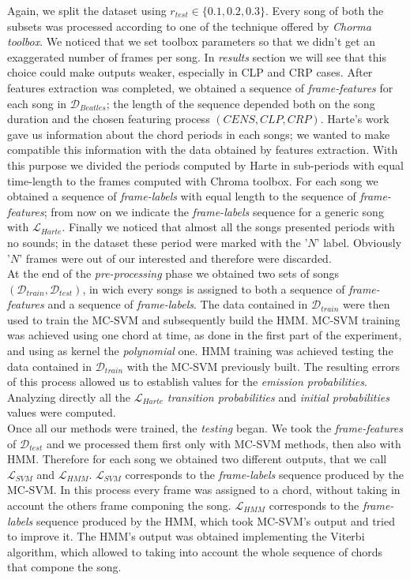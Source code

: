 Again, we split the dataset using $r_{test}\in \{0.1,0.2,0.3\}$. Every song of both the subsets was processed according to one of the technique offered by \textit{Chorma toolbox}. We noticed that we set toolbox parameters so that we didn't get an exaggerated number of frames per song. In \textit{results} section we will see that this choice could make outputs weaker, especially in CLP and CRP cases. After features extraction was completed, we obtained a sequence of \textit{frame-features} for each song in $\mathcal{D}_{Beatles}$; the length of the sequence depended both on the song duration and the chosen featuring process $(CENS,CLP,CRP)$. Harte's work gave us information about the chord periods in each songs; we wanted to make compatible this information with the data obtained by features extraction. With this purpose we divided the periods computed by Harte in sub-periods with equal time-length to the frames computed with Chroma toolbox. For each song we obtained a sequence of \textit{frame-labels} with equal length to the sequence of \textit{frame-features}; from now on we indicate the \textit{frame-labels} sequence for a generic song with $\mathcal{L}_{Harte}$. Finally we noticed that almost all the songs presented periods with no sounds; in the dataset these period were marked with the '$N$' label. Obviously '$N$' frames were out of our interested and therefore were discarded. \\
%
At the end of the \textit{pre-processing} phase we obtained two sets of songs $(\mathcal{D}_{train},\mathcal{D}_{test})$, in wich every songs is assigned to both a sequence of \textit{frame-features} and a sequence of \textit{frame-labels}. The data contained in $\mathcal{D}_{train}$ were then used to train the MC-SVM and subsequently build the HMM. MC-SVM training was achieved using one chord at time, as done in the first part of the experiment, and using as kernel the \textit{polynomial} one. HMM training was achieved testing the data contained in $\mathcal{D}_{train}$ with the MC-SVM previously built. The resulting errors of this process allowed us to establish values for the \textit{emission probabilities}. Analyzing directly all the $\mathcal{L}_{Harte}$ \textit{transition probabilities} and \textit{initial probabilities} values were computed. \\
%
Once all our methods were trained, the \textit{testing} began. We took the \textit{frame-features} of $\mathcal{D}_{test}$ and we processed them first only with MC-SVM methods, then also with HMM. Therefore for each song we obtained two different outputs, that we call $\mathcal{L}_{SVM}$ and $\mathcal{L}_{HMM}$. $\mathcal{L}_{SVM}$ corresponds to the \textit{frame-labels} sequence produced by the MC-SVM. In this process every frame was assigned to a chord, without taking in account the others frame componing the song.  $\mathcal{L}_{HMM}$ corresponds to the \textit{frame-labels} sequence produced by the HMM, which took MC-SVM's output and tried to improve it. The HMM's output was obtained implementing the Viterbi algorithm, which allowed to taking into account the whole sequence of chords that compone the song.
